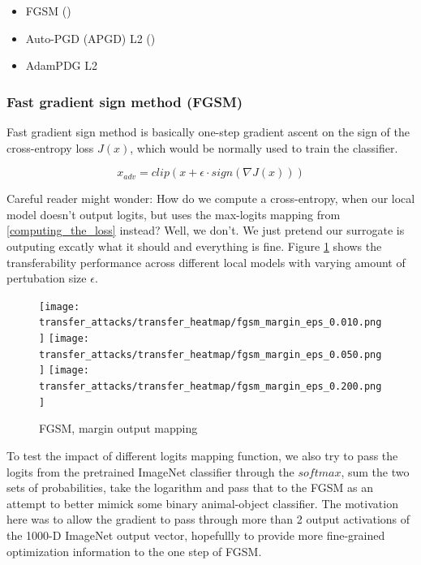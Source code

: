 \begin{itemize}
    \item FGSM (\cite{goodfellow2015explaining})
    \item Auto-PGD (APGD) L2 (\cite{croce2020reliable})
    \item AdamPDG L2
\end{itemize}


\subsubsection{Fast gradient sign method (FGSM)}
Fast gradient sign method is basically one-step gradient ascent on the sign of the cross-entropy loss $J(x)$, which would be normally used to train the classifier.

$$x_{adv} = clip(x + \epsilon \cdot sign(\nabla J(x)))$$


Careful reader might wonder: How do we compute a cross-entropy, when our local model doesn't output logits, but uses the max-logits mapping from \ref{computing_the_loss} instead? Well, we don't. We just pretend our surrogate is outputing excatly what it should and everything is fine. Figure \ref{fig:fgsm_margin} shows the transferability performance across different local models with varying amount of pertubation size $\epsilon$.

\begin{figure}[!htb]
  \texttt{[image: transfer\_attacks/transfer\_heatmap/fgsm\_margin\_eps\_0.010.png]}
\endminipage\hfill
{}
  \texttt{[image: transfer\_attacks/transfer\_heatmap/fgsm\_margin\_eps\_0.050.png]}
\endminipage\hfill
{}%
  \texttt{[image: transfer\_attacks/transfer\_heatmap/fgsm\_margin\_eps\_0.200.png]}
\endminipage
\caption{FGSM, margin output mapping}
\label{fig:fgsm_margin}
\end{figure}

To test the impact of different logits mapping function, we also try to pass the logits from the pretrained ImageNet classifier through the $softmax$, sum the two sets of probabilities, take the logarithm and pass that to the FGSM as an attempt to better mimick some binary animal-object classifier. The motivation here was to allow the gradient to pass through more than 2 output activations of the 1000-D ImageNet output vector, hopefullly to provide more fine-grained optimization information to the one step of FGSM.

